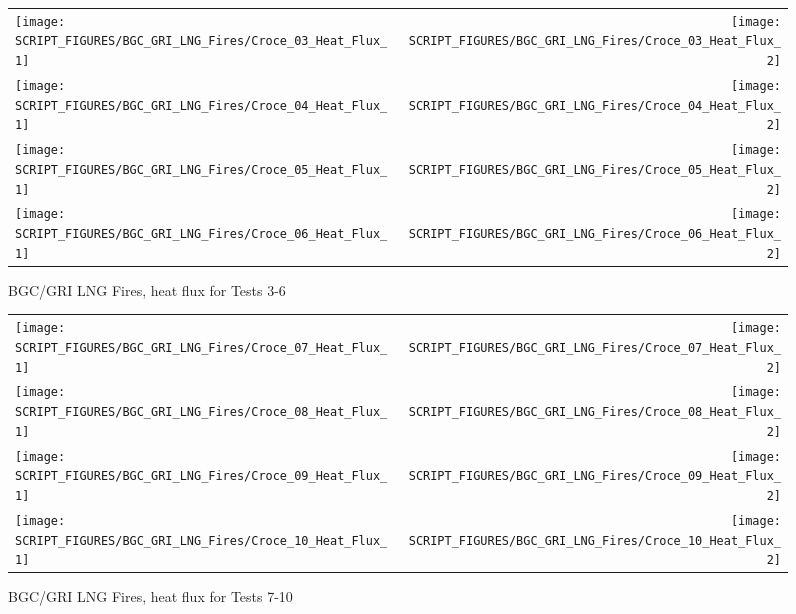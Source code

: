 \newpage

\begin{figure}[p]
\begin{tabular*}{\textwidth}{l@{\extracolsep{\fill}}r}
\texttt{[image: SCRIPT\_FIGURES/BGC\_GRI\_LNG\_Fires/Croce\_03\_Heat\_Flux\_1]} &
\texttt{[image: SCRIPT\_FIGURES/BGC\_GRI\_LNG\_Fires/Croce\_03\_Heat\_Flux\_2]} \\
\texttt{[image: SCRIPT\_FIGURES/BGC\_GRI\_LNG\_Fires/Croce\_04\_Heat\_Flux\_1]} &
\texttt{[image: SCRIPT\_FIGURES/BGC\_GRI\_LNG\_Fires/Croce\_04\_Heat\_Flux\_2]} \\
\texttt{[image: SCRIPT\_FIGURES/BGC\_GRI\_LNG\_Fires/Croce\_05\_Heat\_Flux\_1]} &
\texttt{[image: SCRIPT\_FIGURES/BGC\_GRI\_LNG\_Fires/Croce\_05\_Heat\_Flux\_2]} \\
\texttt{[image: SCRIPT\_FIGURES/BGC\_GRI\_LNG\_Fires/Croce\_06\_Heat\_Flux\_1]} &
\texttt{[image: SCRIPT\_FIGURES/BGC\_GRI\_LNG\_Fires/Croce\_06\_Heat\_Flux\_2]}
\end{tabular*}
\caption[BGC/GRI LNG Fires, heat flux for Tests 3-6]
{BGC/GRI LNG Fires, heat flux for Tests 3-6}
\label{Croce_Heat_Flux_2}
\end{figure}

\begin{figure}[p]
\begin{tabular*}{\textwidth}{l@{\extracolsep{\fill}}r}
\texttt{[image: SCRIPT\_FIGURES/BGC\_GRI\_LNG\_Fires/Croce\_07\_Heat\_Flux\_1]} &
\texttt{[image: SCRIPT\_FIGURES/BGC\_GRI\_LNG\_Fires/Croce\_07\_Heat\_Flux\_2]} \\
\texttt{[image: SCRIPT\_FIGURES/BGC\_GRI\_LNG\_Fires/Croce\_08\_Heat\_Flux\_1]} &
\texttt{[image: SCRIPT\_FIGURES/BGC\_GRI\_LNG\_Fires/Croce\_08\_Heat\_Flux\_2]} \\
\texttt{[image: SCRIPT\_FIGURES/BGC\_GRI\_LNG\_Fires/Croce\_09\_Heat\_Flux\_1]} &
\texttt{[image: SCRIPT\_FIGURES/BGC\_GRI\_LNG\_Fires/Croce\_09\_Heat\_Flux\_2]} \\
\texttt{[image: SCRIPT\_FIGURES/BGC\_GRI\_LNG\_Fires/Croce\_10\_Heat\_Flux\_1]} &
\texttt{[image: SCRIPT\_FIGURES/BGC\_GRI\_LNG\_Fires/Croce\_10\_Heat\_Flux\_2]}
\end{tabular*}
\caption[BGC/GRI LNG Fires, heat flux for Tests 7-10]
{BGC/GRI LNG Fires, heat flux for Tests 7-10}
\label{Croce_Heat_Flux_3}
\end{figure}

